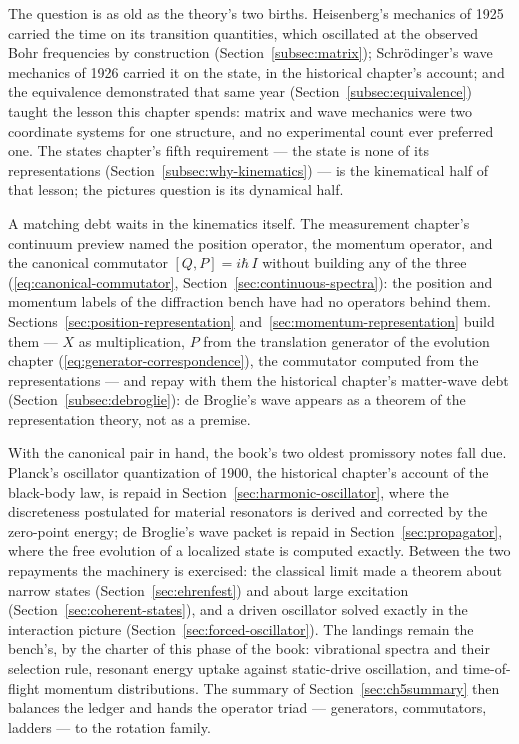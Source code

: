 The question is as old as the theory's two births. Heisenberg's mechanics of 1925 carried the time on its transition quantities, which oscillated at the observed Bohr frequencies by construction (Section~\ref{subsec:matrix}); Schr\"odinger's wave mechanics of 1926 carried it on the state, in the historical chapter's account; and the equivalence demonstrated that same year (Section~\ref{subsec:equivalence}) taught the lesson this chapter spends: matrix and wave mechanics were two coordinate systems for one structure, and no experimental count ever preferred one. The states chapter's fifth requirement --- the state is none of its representations (Section~\ref{subsec:why-kinematics}) --- is the kinematical half of that lesson; the pictures question is its dynamical half.

A matching debt waits in the kinematics itself. The measurement chapter's continuum preview named the position operator, the momentum operator, and the canonical commutator $[Q,P] = i\hbar\,I$ without building any of the three (\eqref{eq:canonical-commutator}, Section~\ref{sec:continuous-spectra}): the position and momentum labels of the diffraction bench have had no operators behind them. Sections~\ref{sec:position-representation} and~\ref{sec:momentum-representation} build them --- $X$ as multiplication, $P$ from the translation generator of the evolution chapter (\eqref{eq:generator-correspondence}), the commutator computed from the representations --- and repay with them the historical chapter's matter-wave debt (Section~\ref{subsec:debroglie}): de Broglie's wave appears as a theorem of the representation theory, not as a premise.

With the canonical pair in hand, the book's two oldest promissory notes fall due. Planck's oscillator quantization of 1900, the historical chapter's account of the black-body law, is repaid in Section~\ref{sec:harmonic-oscillator}, where the discreteness postulated for material resonators is derived and corrected by the zero-point energy; de Broglie's wave packet is repaid in Section~\ref{sec:propagator}, where the free evolution of a localized state is computed exactly. Between the two repayments the machinery is exercised: the classical limit made a theorem about narrow states (Section~\ref{sec:ehrenfest}) and about large excitation (Section~\ref{sec:coherent-states}), and a driven oscillator solved exactly in the interaction picture (Section~\ref{sec:forced-oscillator}). The landings remain the bench's, by the charter of this phase of the book: vibrational spectra and their selection rule, resonant energy uptake against static-drive oscillation, and time-of-flight momentum distributions. The summary of Section~\ref{sec:ch5summary} then balances the ledger and hands the operator triad --- generators, commutators, ladders --- to the rotation family.


